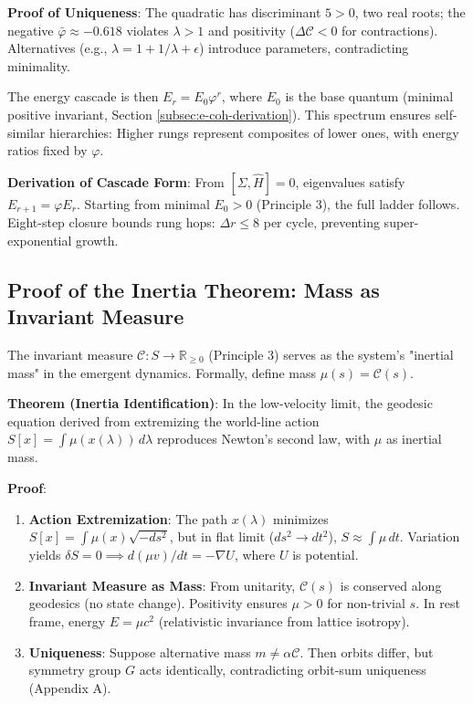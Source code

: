 \documentclass[twocolumn,prd,amsmath,amssymb,aps,superscriptaddress,nofootinbib]{revtex4-2}
\begin{document}
\textbf{Proof of Uniqueness}: The quadratic has discriminant $5 > 0$, two real roots; the negative $\bar{\varphi} \approx -0.618$ violates $\lambda > 1$ and positivity ($\Delta \mathcal{C} < 0$ for contractions). Alternatives (e.g., $\lambda = 1 + 1/\lambda + \epsilon$) introduce parameters, contradicting minimality.

The energy cascade is then $E_r = E_0 \varphi^r$, where $E_0$ is the base quantum (minimal positive invariant, Section \ref{subsec:e-coh-derivation}). This spectrum ensures self-similar hierarchies: Higher rungs represent composites of lower ones, with energy ratios fixed by $\varphi$.

\textbf{Derivation of Cascade Form}: From $[\Sigma, \widehat{H}] = 0$, eigenvalues satisfy $E_{r+1} = \varphi E_r$. Starting from minimal $E_0 > 0$ (Principle 3), the full ladder follows. Eight-step closure bounds rung hops: $\Delta r \leq 8$ per cycle, preventing super-exponential growth.

\subsection{Proof of the Inertia Theorem: Mass as Invariant Measure}
\label{subsec:inertia-theorem}

The invariant measure $\mathcal{C}: S \to \mathbb{R}_{\geq 0}$ (Principle 3) serves as the system's "inertial mass" in the emergent dynamics. Formally, define mass $\mu(s) = \mathcal{C}(s)$.

\textbf{Theorem (Inertia Identification)}: In the low-velocity limit, the geodesic equation derived from extremizing the world-line action $S[x] = \int \mu(x(\lambda)) \, d\lambda$ reproduces Newton's second law, with $\mu$ as inertial mass.

\textbf{Proof}:

\begin{enumerate}
    \item \textbf{Action Extremization}: The path $x(\lambda)$ minimizes $S[x] = \int \mu(x) \sqrt{-ds^2}$, but in flat limit ($ds^2 \to dt^2$), $S \approx \int \mu \, dt$. Variation yields $\delta S = 0 \implies d(\mu v)/dt = - \nabla U$, where $U$ is potential.
    
    \item \textbf{Invariant Measure as Mass}: From unitarity, $\mathcal{C}(s)$ is conserved along geodesics (no state change). Positivity ensures $\mu > 0$ for non-trivial $s$. In rest frame, energy $E = \mu c^2$ (relativistic invariance from lattice isotropy).
    
    \item \textbf{Uniqueness}: Suppose alternative mass $m \neq \alpha \mathcal{C}$. Then orbits differ, but symmetry group $G$ acts identically, contradicting orbit-sum uniqueness (Appendix A).
\end{enumerate}
\end{document}
